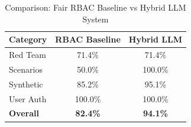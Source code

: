 \begin{table}[t]
    \centering
    \caption{Comparison: Fair RBAC Baseline vs Hybrid LLM System}
    \label{tab:fair_comparison}
    \begin{tabular}{lcc}
        \toprule
        \textbf{Category} & \textbf{RBAC Baseline} & \textbf{Hybrid LLM} \\
        \midrule
        Red Team             &  71.4\% &  71.4\% \\
        Scenarios            &  50.0\% & 100.0\% \\
        Synthetic            &  85.2\% &  95.1\% \\
        User Auth            & 100.0\% & 100.0\% \\
        \midrule
        \textbf{Overall} & \textbf{82.4\%} & \textbf{94.1\%} \\
        \bottomrule
    \end{tabular}
\end{table}
